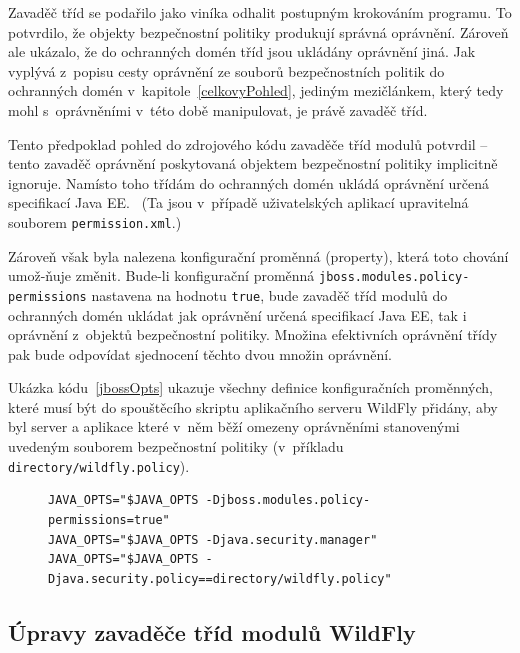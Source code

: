 Zavaděč tříd se podařilo jako viníka odhalit postupným krokováním programu.
To potvrdilo, že objekty bezpečnostní politiky produkují správná oprávnění.
Zároveň ale ukázalo, že do ochranných domén tříd jsou ukládány oprávnění jiná.
Jak vyplývá z~popisu cesty oprávnění ze souborů bezpečnostních politik do ochranných domén v~kapitole~\ref{celkovyPohled},
jediným mezičlánkem, který tedy mohl s~oprávněními v~této době manipulovat, je právě zavaděč tříd.

Tento předpoklad pohled do zdrojového kódu zavaděče tříd modulů potvrdil -- tento zavaděč oprávnění poskytovaná objektem bezpečnostní politiky implicitně ignoruje.
Namísto toho třídám do ochranných domén ukládá oprávnění určená specifikací Java EE.~\cite{javaEEspec}
(Ta jsou v~případě uživatelských aplikací upravitelná souborem {\tt permission.xml}.)

Zároveň však byla nalezena konfigurační proměnná (property), která toto chování umož-{\linebreak}ňuje změnit.
Bude-li konfigurační proměnná {\tt jboss.modules.policy-permissions} nastavena na hodnotu {\tt true}, bude zavaděč tříd modulů do ochranných domén ukládat jak oprávnění určená specifikací Java EE, tak i oprávnění z~objektů bezpečnostní politiky.
Množina efektivních oprávnění třídy pak bude odpovídat sjednocení těchto dvou množin oprávnění.
\cite{sourceModuleClassLoader}

Ukázka kódu~\ref{jbossOpts} ukazuje všechny definice konfiguračních proměnných, které musí být do spouštěcího skriptu aplikačního serveru WildFly přidány,
aby byl server a aplikace které v~něm běží omezeny oprávněními stanovenými uvedeným souborem bezpečnostní politiky (v~příkladu {\tt directory/wildfly.policy}).

\begin{figure}[tbh]
\begin{lstlisting}[caption=Úprava spouštěcího skriptu pro spuštění s~bezpečnostní politikou, label=jbossOpts]
JAVA_OPTS="$JAVA_OPTS -Djboss.modules.policy-permissions=true"
JAVA_OPTS="$JAVA_OPTS -Djava.security.manager"
JAVA_OPTS="$JAVA_OPTS -Djava.security.policy==directory/wildfly.policy"
\end{lstlisting}
\end{figure}

\subsection{Úpravy zavaděče tříd modulů WildFly} \label{upravaZavadeceWildFly}

